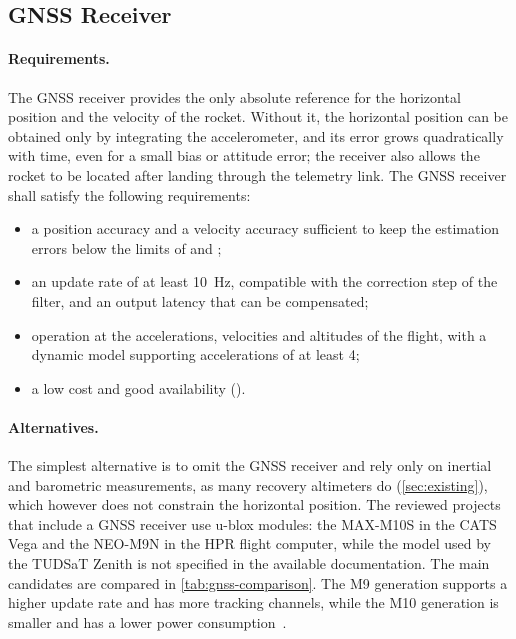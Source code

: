 \subsection{GNSS Receiver}
\label{sec:gnss-choice}

\paragraph{Requirements.} The GNSS receiver provides the only absolute reference for the horizontal position and the velocity of the rocket. Without it, the horizontal position can be obtained only by integrating the accelerometer, and its error grows quadratically with time, even for a small bias or attitude error; the receiver also allows the rocket to be located after landing through the telemetry link. The GNSS receiver shall satisfy the following requirements:
\begin{itemize}
    \item a position accuracy and a velocity accuracy sufficient to keep the estimation errors below the limits of  and ;
    \item an update rate of at least \SI{10}{Hz}, compatible with the correction step of the filter, and an output latency that can be compensated;
    \item operation at the accelerations, velocities and altitudes of the flight, with a dynamic model supporting accelerations of at least \SI{4}{\gforce}; 
    \item a low cost and good availability ().
\end{itemize}

\paragraph{Alternatives.} The simplest alternative is to omit the GNSS receiver and rely only on inertial and barometric measurements, as many recovery altimeters do (\cref{sec:existing}), which however does not constrain the horizontal position. The reviewed projects that include a GNSS receiver use u-blox modules: the MAX-M10S in the CATS Vega and the NEO-M9N in the HPR flight computer, while the model used by the TUDSaT Zenith is not specified in the available documentation. The main candidates are compared in \cref{tab:gnss-comparison}. The M9 generation supports a higher update rate and has more tracking channels, while the M10 generation is smaller and has a lower power consumption~\cite{m9n:datasheet,m10s:datasheet}.


